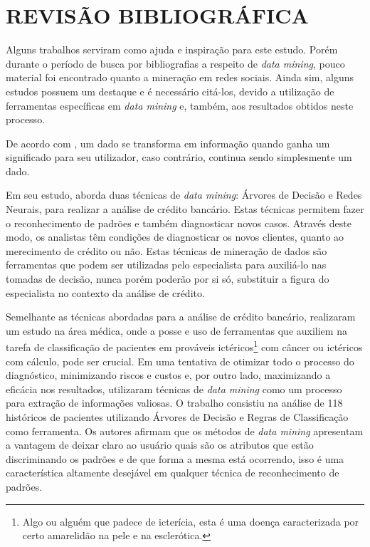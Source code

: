 \chapter{REVISÃO BIBLIOGRÁFICA}\label{ch:rev-bibs}

Alguns trabalhos serviram como ajuda e inspiração para este estudo. Porém durante o período de busca por bibliografias a respeito de \textit{data mining}, pouco material foi encontrado quanto a mineração em redes sociais. Ainda sim, alguns estudos possuem um destaque e é necessário citá-los, devido a utilização de ferramentas específicas em \textit{data mining} e, também, aos resultados obtidos neste processo.

De acordo com , um dado se transforma em informação quando ganha um significado para seu utilizador, caso contrário, continua sendo simplesmente um dado.

Em seu estudo,  aborda duas técnicas de \textit{data mining}: Árvores de Decisão e Redes Neurais, para realizar a análise de crédito bancário. Estas técnicas permitem fazer o reconhecimento de padrões e também diagnosticar novos casos. Através deste modo, os analistas têm condições de diagnosticar os novos clientes, quanto ao merecimento de crédito ou não. Estas técnicas de mineração de dados são ferramentas que podem ser utilizadas pelo especialista para auxiliá-lo nas tomadas de decisão, nunca porém poderão por si só, substituir a figura do especialista no contexto da análise de crédito.

Semelhante as técnicas abordadas para a análise de crédito bancário,  realizaram um estudo na área médica, onde a posse e uso de ferramentas que auxiliem na tarefa de classificação de pacientes em prováveis ictéricos\footnote{Algo ou alguém que padece de icterícia, esta é uma doença caracterizada por certo amarelidão na pele e na esclerótica.} com câncer ou ictéricos com cálculo, pode ser crucial. Em uma tentativa de otimizar todo o processo do diagnóstico, minimizando riscos e custos e, por outro lado, maximizando a eficácia nos resultados, utilizaram técnicas de  \textit{data mining} como um processo para extração de informações valiosas. O trabalho consistiu na análise de 118 históricos de pacientes utilizando Árvores de Decisão e Regras de Classificação como ferramenta. Os autores afirmam que os métodos de \textit{data mining} apresentam a vantagem de deixar claro ao usuário quais são os atributos que estão discriminando os padrões e de que forma a mesma está ocorrendo, isso é uma característica altamente desejável em qualquer técnica de reconhecimento de padrões.

